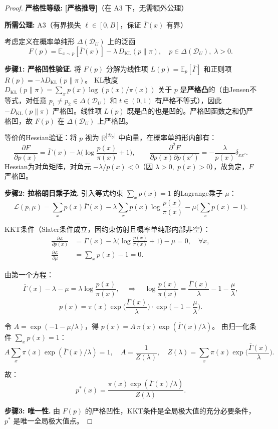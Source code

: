 \documentclass[12pt,a4paper]{article}
\newcommand{\E}{\mathbb{E}}
\newcommand{\cD}{\mathcal{D}}
\newcommand{\KL}{D_{\mathrm{KL}}}
\newcommand{\rigorous}{\textbf{[严格推导]}}
\begin{document}
\begin{proof}
\textbf{严格性等级:} \rigorous \quad（在 A3 下，无需额外公理）

\textbf{所需公理:} A3（有界损失 $\ell\in[0,B]$，保证 $\overline{\Gamma}(x)$ 有界）

考虑定义在概率单纯形 $\Delta(\cD_U)$ 上的泛函
\[
F(p) = \E_{x\sim p}[\overline{\Gamma}(x)] - \lambda\,\KL(p\|\pi),\quad p\in\Delta(\cD_U),\;\lambda>0.
\]

\textbf{步骤1: 严格凹性验证.}
将 $F(p)$ 分解为线性项 $L(p)=\E_p[\overline{\Gamma}]$ 和正则项 $R(p)=-\lambda\KL(p\|\pi)$。
KL散度 $\KL(p\|\pi)=\sum_x p(x)\log(p(x)/\pi(x))$ 关于 $p$ 是\textbf{严格凸}的（由Jensen不等式，对任意 $p_1\neq p_2\in\Delta(\cD_U)$ 和 $t\in(0,1)$ 有严格不等式），因此 $-\KL(p\|\pi)$ 严格凹。线性项 $L(p)$ 既是凸的也是凹的。严格凹函数之和仍严格凹，故 $F(p)$ 在 $\Delta(\cD_U)$ 上严格凹。

等价的Hessian验证：将 $p$ 视为 $\mathbb{R}^{|\cD_U|}$ 中向量，在概率单纯形内部有：
\[
\frac{\partial F}{\partial p(x)} = \overline{\Gamma}(x)
- \lambda\Big(\log\frac{p(x)}{\pi(x)}+1\Big),\qquad
\frac{\partial^2 F}{\partial p(x)\partial p(x')} = -\frac{\lambda}{p(x)}\delta_{xx'}.
\]
Hessian为对角矩阵，对角元 $-\lambda/p(x)<0$（因 $\lambda>0,\;p(x)>0$），故负定，$F$ 严格凹。

\textbf{步骤2: 拉格朗日乘子法.}
引入等式约束 $\sum_x p(x)=1$ 的Lagrange乘子 $\mu$：
\[
\mathcal{L}(p,\mu) = \sum_x p(x)\overline{\Gamma}(x)
- \lambda\sum_x p(x)\log\frac{p(x)}{\pi(x)}
- \mu\Big(\sum_x p(x)-1\Big).
\]

KKT条件（Slater条件成立，因约束仿射且概率单纯形内部非空）：
\begin{align*}
\frac{\partial\mathcal{L}}{\partial p(x)}
&= \overline{\Gamma}(x)
- \lambda\Big(\log\frac{p(x)}{\pi(x)}+1\Big) - \mu = 0,\quad \forall x,\\
\frac{\partial\mathcal{L}}{\partial\mu}
&= \sum_x p(x) - 1 = 0.
\end{align*}

由第一个方程：
\[
\overline{\Gamma}(x) - \lambda - \mu = \lambda\log\frac{p(x)}{\pi(x)},
\quad\Rightarrow\quad
\log\frac{p(x)}{\pi(x)} = \frac{\overline{\Gamma}(x)}{\lambda} - 1 - \frac{\mu}{\lambda},
\]
\[
p(x) = \pi(x)\exp\!\Big(\frac{\overline{\Gamma}(x)}{\lambda}\Big)
\cdot\exp\!\Big(-1-\frac{\mu}{\lambda}\Big).
\]

令 $A = \exp(-1-\mu/\lambda)$，得 $p(x) = A\,\pi(x)\exp(\overline{\Gamma}(x)/\lambda)$。
由归一化条件 $\sum_x p(x)=1$：
\[
A\sum_x \pi(x)\exp(\overline{\Gamma}(x)/\lambda) = 1,\quad
A = \frac{1}{Z(\lambda)},\quad
Z(\lambda)=\sum_x \pi(x)\exp\!\Big(\frac{\overline{\Gamma}(x)}{\lambda}\Big).
\]

故：
\[
p^*(x) = \frac{\pi(x)\exp(\overline{\Gamma}(x)/\lambda)}{Z(\lambda)}.
\]

\textbf{步骤3: 唯一性.}
由 $F(p)$ 的严格凹性，KKT条件是全局极大值的充分必要条件，$p^*$ 是唯一全局极大值点。
\end{proof}
\end{document}
